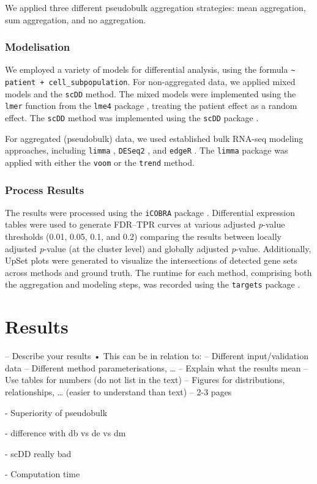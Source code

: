 \documentclass[a4paper, 11pt, twocolumn]{article}
\begin{document}
\begin{multicols}{2}
We applied three different pseudobulk aggregation strategies: mean aggregation, sum aggregation, and no aggregation.

\subsubsection{Modelisation}

We employed a variety of models for differential analysis, using the formula \texttt{\textasciitilde{} patient + cell\_subpopulation}. For non-aggregated data, we applied mixed models and the \texttt{scDD} method. The mixed models were implemented using the \texttt{lmer} function from the \texttt{lme4} package \citep{lme4}, treating the patient effect as a random effect. The \texttt{scDD} method was implemented using the \texttt{scDD} package \citep{scdd}.

For aggregated (pseudobulk) data, we used established bulk RNA-seq modeling approaches, including \texttt{limma} \citep{limma}, \texttt{DESeq2} \citep{deseq2}, and \texttt{edgeR} \citep{edger}. The \texttt{limma} package was applied with either the \texttt{voom} or the \texttt{trend} method.

\subsubsection{Process Results}

The results were processed using the \texttt{iCOBRA} package \citep{icobra}. Differential expression tables were used to generate FDR–TPR curves at various adjusted \textit{p}-value thresholds (0.01, 0.05, 0.1, and 0.2) comparing the results between locally adjusted \textit{p}-value (at the cluster level) and globally adjusted \textit{p}-value. Additionally, UpSet plots were generated to visualize the intersections of detected gene sets across methods and ground truth. The runtime for each method, comprising both the aggregation and modeling steps, was recorded using the \texttt{targets} package \citep{targets}.
	
\section{Results}

– Describe your results
• This can be in relation to:
– Different input/validation data
– Different method parameterisations, …
– Explain what the results mean
– Use tables for numbers (do not list in the text)
– Figures for distributions, relationships, … (easier
to understand than text)
– 2-3 pages


- Superiority of pseudobulk

- difference with db vs de vs dm

- scDD really bad

- Computation time


\end{multicols}
\end{document}

